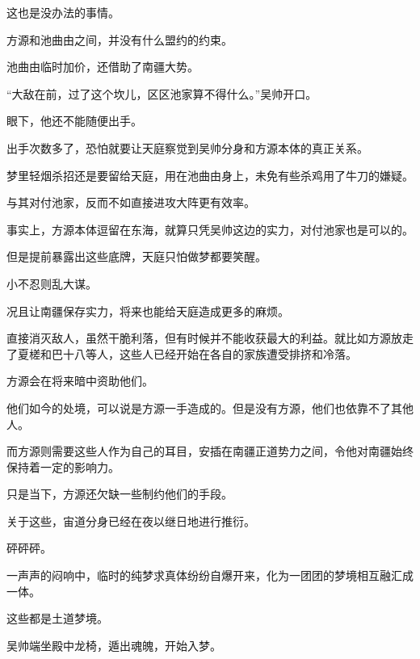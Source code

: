 \begin{this_body}
这也是没办法的事情。

方源和池曲由之间，并没有什么盟约的约束。

池曲由临时加价，还借助了南疆大势。

“大敌在前，过了这个坎儿，区区池家算不得什么。”吴帅开口。

眼下，他还不能随便出手。

出手次数多了，恐怕就要让天庭察觉到吴帅分身和方源本体的真正关系。

梦里轻烟杀招还是要留给天庭，用在池曲由身上，未免有些杀鸡用了牛刀的嫌疑。

与其对付池家，反而不如直接进攻大阵更有效率。

事实上，方源本体逗留在东海，就算只凭吴帅这边的实力，对付池家也是可以的。

但是提前暴露出这些底牌，天庭只怕做梦都要笑醒。

小不忍则乱大谋。

况且让南疆保存实力，将来也能给天庭造成更多的麻烦。

直接消灭敌人，虽然干脆利落，但有时候并不能收获最大的利益。就比如方源放走了夏槎和巴十八等人，这些人已经开始在各自的家族遭受排挤和冷落。

方源会在将来暗中资助他们。

他们如今的处境，可以说是方源一手造成的。但是没有方源，他们也依靠不了其他人。

而方源则需要这些人作为自己的耳目，安插在南疆正道势力之间，令他对南疆始终保持着一定的影响力。

只是当下，方源还欠缺一些制约他们的手段。

关于这些，宙道分身已经在夜以继日地进行推衍。

砰砰砰。

一声声的闷响中，临时的纯梦求真体纷纷自爆开来，化为一团团的梦境相互融汇成一体。

这些都是土道梦境。

吴帅端坐殿中龙椅，遁出魂魄，开始入梦。

\end{this_body}


